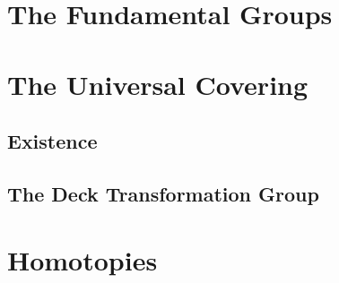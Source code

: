 \documentclass[Total.tex]{subfiles}
\begin{document}
	\chapter{The Fundamental Groups}
	\chapter{The Universal Covering}
		\section{Existence}
		\section{The Deck Transformation Group}
	\chapter{Homotopies}
	\chapter{}
\end{document}
